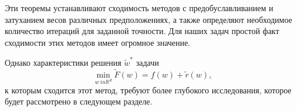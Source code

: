 Эти теоремы устанавливают сходимость методов с предобуславливанием и затуханием весов различных предположениях, а также определяют необходимое количество итераций для заданной точности. Для наших задач простой факт сходимости этих методов имеет огромное значение. 

Однако характеристики решения $\widetilde{w}^*$ задачи
\begin{equation} \label{F_tilde_problem}
	\min_{w \ in \mathbb{R}^d} \tilde{F}(w) = f(w) + \tilde{r}(w),
\end{equation}
к которым сходится этот метод, требуют более глубокого исследования, которое будет рассмотрено в следующем разделе.



